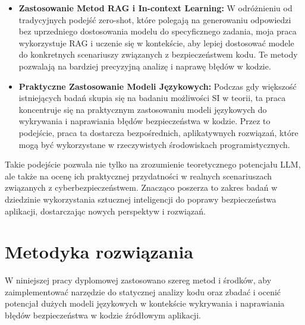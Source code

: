 \begin{itemize}
    \item \textbf{Zastosowanie Metod RAG i In-context Learning:} W odróżnieniu od tradycyjnych podejść zero-shot, które polegają na generowaniu odpowiedzi bez uprzedniego dostosowania modelu do specyficznego zadania, moja praca wykorzystuje RAG i uczenie się w kontekście, aby lepiej dostosować modele do konkretnych scenariuszy związanych z bezpieczeństwem kodu. Te metody pozwalają na bardziej precyzyjną analizę i naprawę błędów w kodzie.
    
    \item \textbf{Praktyczne Zastosowanie Modeli Językowych:} Podczas gdy większość istniejących badań skupia się na badaniu możliwości SI w teorii, ta praca koncentruje się na praktycznym zastosowaniu modeli językowych do wykrywania i naprawiania błędów bezpieczeństwa w kodzie. Przez to podejście, praca ta dostarcza bezpośrednich, aplikatywnych rozwiązań, które mogą być wykorzystane w rzeczywistych środowiskach programistycznych.
\end{itemize}

Takie podejście pozwala nie tylko na zrozumienie teoretycznego potencjału LLM, ale także na ocenę ich praktycznej przydatności w realnych scenariuszach związanych z cyberbezpieczeństwem. Znacząco poszerza to zakres badań w dziedzinie wykorzystania sztucznej inteligencji do poprawy bezpieczeństwa aplikacji, dostarczając nowych perspektyw i rozwiązań.

\chapter{Metodyka rozwiązania}

W niniejszej pracy dyplomowej zastosowano szereg metod i środków, aby zaimplementować narzędzie do statycznej analizy kodu oraz zbadać i ocenić potencjał dużych modeli językowych w kontekście wykrywania i naprawiania błędów bezpieczeństwa w kodzie źródłowym aplikacji.

